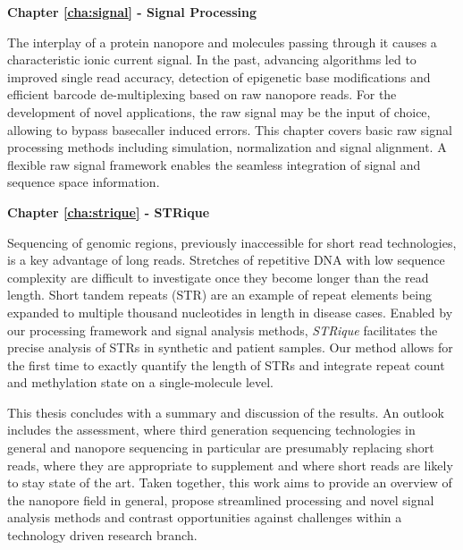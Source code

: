 \textbf{Chapter \ref{cha:signal} - Signal Processing}

The interplay of a protein nanopore and molecules passing through it causes a characteristic ionic current signal.
In the past, advancing algorithms led to improved single read accuracy, detection of epigenetic base modifications and efficient barcode de-multiplexing based on raw nanopore reads.
For the development of novel applications, the raw signal may be the input of choice, allowing to bypass basecaller induced errors.
This chapter covers basic raw signal processing methods including simulation, normalization and signal alignment.
A flexible raw signal framework enables the seamless integration of signal and sequence space information.
 

\textbf{Chapter \ref{cha:strique} - STRique}

Sequencing of genomic regions, previously inaccessible for short read technologies, is a key advantage of long reads.
Stretches of repetitive DNA with low sequence complexity are difficult to investigate once they become longer than the read length.
Short tandem repeats (STR) are an example of repeat elements being expanded to multiple thousand nucleotides in length in disease cases.
Enabled by our processing framework and signal analysis methods, \textit{STRique} facilitates the precise analysis of STRs in synthetic and patient samples.
Our method allows for the first time to exactly quantify the length of STRs and integrate repeat count and methylation state on a single-molecule level.


This thesis concludes with a summary and discussion of the results.
An outlook includes the assessment, where third generation sequencing technologies in general and nanopore sequencing in particular are presumably replacing short reads, where they are appropriate to supplement and where short reads are likely to stay state of the art.
Taken together, this work aims to provide an overview of the nanopore field in general, propose streamlined processing and novel signal analysis methods and contrast opportunities against challenges within a technology driven research branch.








